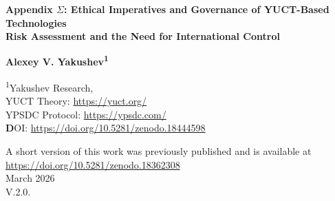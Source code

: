 \documentclass[12pt,a4paper]{article}
\theoremstyle{remark}
\begin{document}
	
	\begin{titlepage}
		\begin{center}
			\vspace*{1cm}
			
			\Huge\textbf{Appendix $\Sigma$: Ethical Imperatives and Governance of YUCT-Based Technologies} \\
			\vspace{0.5cm}
			\Large\textbf{Risk Assessment and the Need for International Control}
			
			\vspace{1.5cm}
			
			\Large\textbf{Alexey V. Yakushev\textsuperscript{1}}
			
			\vspace{0.3cm}
			\large
			\textsuperscript{1}Yakushev Research, \\ 
	YUCT Theory: \url{https://yuct.org/}\\
YPSDC Protocol: \url{https://ypsdc.com/}\\


\vspace{2cm}
\textbf DOI: \url{https://doi.org/10.5281/zenodo.18444598}\\

\vspace{1cm}

\vspace{0cm}
\large 
A short version of this work was previously published and is available at\\ \url{https://doi.org/10.5281/zenodo.18362308}\\
\vspace{1cm}
March 2026 \\ \large V.2.0.
			
			\vspace{1cm}
			\newpage
			\begin{minipage}{0.9\textwidth}
				\begin{abstract}
					\noindent
					The Yakushev Unified Coordination Theory (YUCT) provides a mathematical framework unifying physics, chemistry, biology, and social sciences. Its practical applications — from precision chemistry and geophysical prospecting to economic forecasting and cognitive enhancement — carry unprecedented potential for both benefit and harm. This appendix systematically examines the risks associated with key YUCT-derived technologies, as well as the new generative scientific disciplines spawned by the theory. We argue that the very power of these tools demands a new level of global governance based not on prohibitions but on control, development parity, and conscious expansion of applicability boundaries. Drawing on successful precedents from nuclear non-proliferation, we propose a multi-layered international architecture including a framework treaty, a verification body, export control regimes, and binding UN Security Council resolutions. Special attention is given to scaling effects — from planetary to cosmological levels — and the need for preventive ethical reflection.
				\end{abstract}
			\end{minipage}
			

\end{center}
\end{titlepage}
\end{document}
